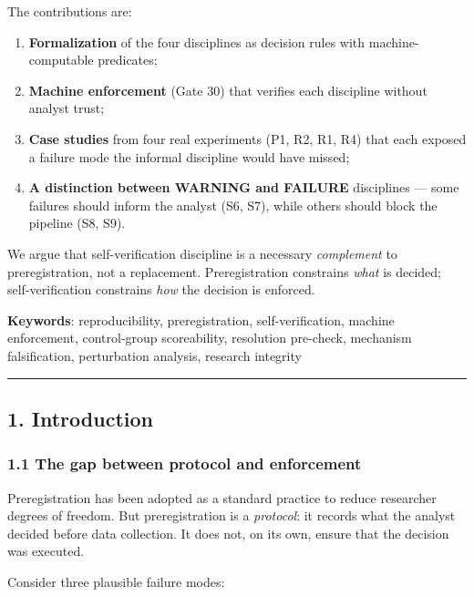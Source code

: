 \documentclass[
]{article}
\providecommand{\tightlist}{%
  \setlength{\itemsep}{0pt}\setlength{\parskip}{0pt}}
\begin{document}
The contributions are:

\begin{enumerate}
\def\labelenumi{\arabic{enumi}.}
\tightlist
\item
  \textbf{Formalization} of the four disciplines as decision rules with
  machine-computable predicates;
\item
  \textbf{Machine enforcement} (Gate 30) that verifies each discipline
  without analyst trust;
\item
  \textbf{Case studies} from four real experiments (P1, R2, R1, R4) that
  each exposed a failure mode the informal discipline would have missed;
\item
  \textbf{A distinction between WARNING and FAILURE} disciplines ---
  some failures should inform the analyst (S6, S7), while others should
  block the pipeline (S8, S9).
\end{enumerate}

We argue that self-verification discipline is a necessary
\emph{complement} to preregistration, not a replacement. Preregistration
constrains \emph{what} is decided; self-verification constrains
\emph{how} the decision is enforced.

\textbf{Keywords}: reproducibility, preregistration, self-verification,
machine enforcement, control-group scoreability, resolution pre-check,
mechanism falsification, perturbation analysis, research integrity

\begin{center}\rule{0.5\linewidth}{0.5pt}\end{center}

\subsection{1. Introduction}\label{introduction}

\subsubsection{1.1 The gap between protocol and
enforcement}\label{the-gap-between-protocol-and-enforcement}

Preregistration has been adopted as a standard practice to reduce
researcher degrees of freedom. But preregistration is a \emph{protocol}:
it records what the analyst decided before data collection. It does not,
on its own, ensure that the decision was executed.

Consider three plausible failure modes:
\end{document}
